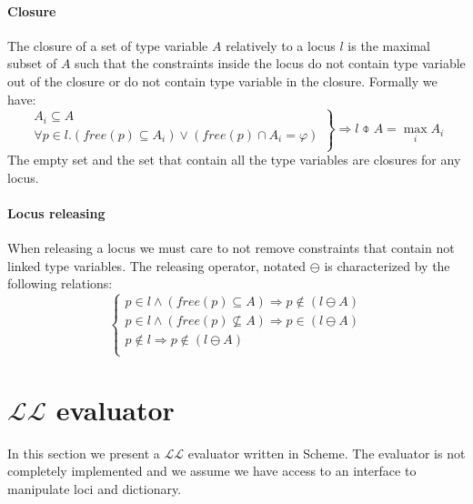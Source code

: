 \documentclass[a4paper]{report}
\newcommand{\lang}[0]{\mathcal{L}}
\begin{document}
\paragraph{Closure} The closure of a set of type variable $A$ relatively to a locus $l$ is the maximal subset of $A$ such that the constraints inside the locus do not contain type variable out of the closure or do not contain type variable in the closure. Formally we have:
$$\left.\begin{array}{l}
A_i\subseteq A\\
\forall p\in l . (free(p) \subseteq A_i)\vee(free(p)\cap A_i=\varphi)\\
\end{array}\right\}\Rightarrow l \obar A = \max_i{A_i}$$
The empty set and the set that contain all the type variables are closures for any locus.

\paragraph{Locus releasing} When releasing a locus we must care to not remove constraints that contain not linked type variables. The releasing operator, notated $\ominus$ is characterized by the following relations:
$$\left\{\begin{array}{l}
p\in l \wedge (free(p)\subseteq A)\Rightarrow p\notin (l\ominus A)\\
p\in l \wedge (free(p) \nsubseteq A) \Rightarrow p \in (l\ominus A)\\
p\notin l \Rightarrow p\notin (l\ominus A)\\
\end{array}\right.$$

\section{$\lang\lang$ evaluator}

In this section we present a $\lang\lang$ evaluator written in Scheme. The evaluator is not completely implemented and we assume we have access to an interface to manipulate loci and dictionary.
\end{document}

